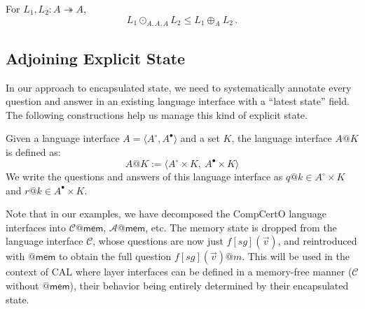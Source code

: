 \documentclass[acmsmall,screen,review,anonymous]{acmart}
\newcommand{\kw}[1]{\ensuremath{ \mathsf{#1} }}
\newcommand{\que}{\circ}
\newcommand{\ans}{\bullet}
\begin{document}
\begin{theorem}
For $L_1, L_2 : A \twoheadrightarrow A$,
\[
  L_1 \odot_{A,A,A} L_2
  \le
  L_1 \oplus_A L_2
 \,.
\]
\end{theorem}


\subsection{Adjoining Explicit State} \label{sec:basic:state} %

In our approach to encapsulated state,
we need to systematically
annotate every question and answer
in an existing language interface
with a ``latest state'' field.
The following constructions help us manage
this kind of explicit state.

\begin{definition}
Given a language interface $A = \langle A^\que, A^\ans \rangle$
and a set $K$,
the language interface $A@K$ is defined as:
\[
  A@K := \langle A^\que \times K ,\: A^\ans \times K \rangle
\]
We write the questions and answers of this language interface as
$q@k \in A^\que \times K$ and
$r@k \in A^\ans \times K$.
\end{definition}

Note that in our examples,
we have decomposed the CompCertO language interfaces
into $\mathcal{C}@\kw{mem}$, $\mathcal{A}@\kw{mem}$, etc.
The memory state is dropped from the language interface $\mathcal{C}$,
whose questions are now just $f[\mathit{sg}](\vec{v})$,
and reintroduced with $@\kw{mem}$ to obtain
the full question $f[\mathit{sg}](\vec{v})@m$.
This will be used in the context of CAL
where layer interfaces can be defined in a memory-free manner
($\mathcal{C}$ without $@\kw{mem}$),
their behavior being entirely determined by their encapsulated state.
\end{document}
